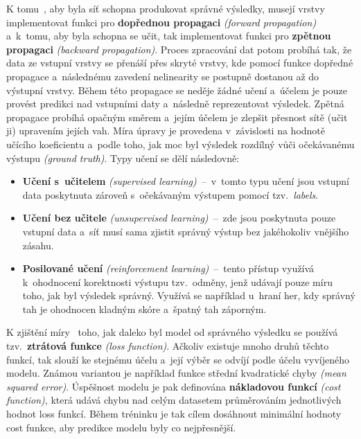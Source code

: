 K tomu~\cite{website:NNForBeginnersByBeginner}, aby byla síť schopna produkovat správné výsledky, musejí vrstvy implementovat funkci pro \textbf{dopřednou propagaci} \emph{(forward propagation)} a~k~tomu, aby byla schopna se učit, tak implementovat funkci pro \textbf{zpětnou propagaci} \emph{(backward propagation)}. Proces zpracování dat potom probíhá tak, že data ze vstupní vrstvy se přenáší přes skryté vrstvy, kde pomocí funkce dopředné propagace a~následnému zavedení nelinearity se postupně dostanou až do výstupní vrstvy. Během této propagace se neděje žádné učení a~účelem je pouze provést predikci nad vstupními daty a~následně reprezentovat výsledek. Zpětná propagace probíhá opačným směrem a~jejím účelem je zlepšit přesnost sítě (učit ji) upravením jejích vah. Míra úpravy je provedena v~závislosti na hodnotě učícího koeficientu a~podle toho, jak moc byl výsledek rozdílný vůči očekávanému výstupu \emph{(ground truth)}. Typy učení se dělí následovně:
\begin{itemize}
    \item \textbf{Učení s~učitelem} \emph{(supervised learning)}~--~v~tomto typu učení jsou vstupní data poskytnuta zároveň s~očekávaným výstupem pomocí tzv.~\emph{labels}.
    \item \textbf{Učení bez učitele} \emph{(unsupervised learning)}~--~zde jsou poskytnuta pouze vstupní data a~síť musí sama zjistit správný výstup bez jakéhokoliv vnějšího zásahu. 
    \item \textbf{Posilované učení} \emph{(reinforcement learning)}~--~tento přístup využívá k~ohodnocení korektnosti výstupu tzv.~odměny, jenž udávají pouze míru toho, jak byl výsledek správný. Využívá se například u~hraní her, kdy správný tah je ohodnocen kladným skóre a~špatný tah záporným.
\end{itemize}

K zjištění míry~\cite{website:NNForBeginnersByBeginner} toho, jak daleko byl model od správného výsledku se používá tzv.~\textbf{ztrátová funkce} \emph{(loss function)}. Ačkoliv existuje mnoho druhů těchto funkcí, tak slouží ke stejnému účelu a~její výběr se odvíjí podle účelu vyvíjeného modelu. Známou variantou je například funkce střední kvadratické chyby \emph{(mean squared error)}. Úspěšnost modelu je pak definována \textbf{nákladovou funkcí} \emph{(cost function)}, která udává chybu nad celým datasetem průměrováním jednotlivých hodnot loss funkcí. Během tréninku je tak cílem dosáhnout minimální hodnoty cost funkce, aby predikce modelu byly co nejpřesnější.

